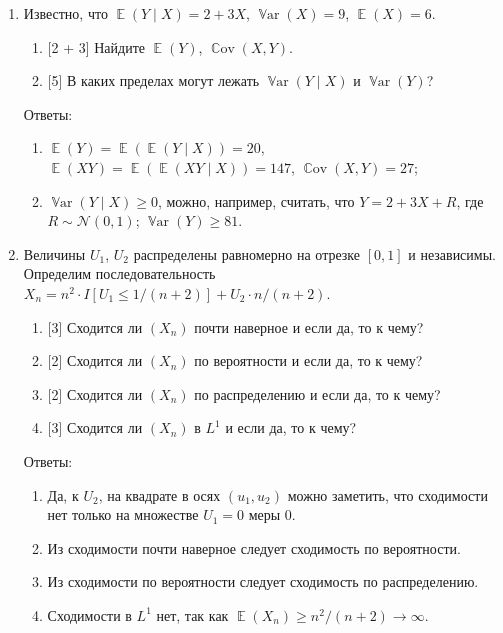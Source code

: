\documentclass[12pt]{article}
\DeclareMathOperator{\Cov}{\mathbb{C}ov}
\DeclareMathOperator{\Var}{\mathbb{V}ar}
\DeclareMathOperator{\E}{\mathbb{E}}
\newcommand \cN{\mathcal{N}}
\begin{document}
\begin{enumerate}

    \item Известно, что $\E(Y \mid X) = 2 + 3X$, $\Var(X) = 9$, $\E(X) = 6$.
    \begin{enumerate}
        \item {[2 + 3]} Найдите $\E(Y)$, $\Cov(X, Y)$.
        \item {[5]} В каких пределах могут лежать $\Var(Y \mid X)$ и $\Var(Y)$?
    \end{enumerate}

    Ответы:

    \begin{enumerate}
        \item $\E(Y) = \E(\E(Y \mid X)) = 20$, $\E(XY) = \E(\E(XY \mid X)) = 147$, $\Cov(X, Y) = 27$;
        \item $\Var(Y \mid X) \geq 0$, можно, например, считать, что $Y = 2 + 3X + R$, где $R \sim \cN(0, 1)$; $\Var(Y) \geq 81$.
    \end{enumerate}



    \item Величины $U_1$, $U_2$ распределены равномерно на отрезке $[0, 1]$ и независимы.
    Определим последовательность $X_n = n^2 \cdot I[U_1 \leq 1/(n + 2)] + U_2 \cdot n/ (n+2)$.

    \begin{enumerate}
        \item {[3]} Сходится ли $(X_n)$ почти наверное и если да, то к чему?
        \item {[2]} Сходится ли $(X_n)$ по вероятности и если да, то к чему?
        \item {[2]} Сходится ли $(X_n)$ по распределению и если да, то к чему?
        \item {[3]} Сходится ли $(X_n)$ в $L^1$ и если да, то к чему?
    \end{enumerate}

    Ответы: 

    \begin{enumerate}
        \item Да, к $U_2$, на квадрате в осях $(u_1, u_2)$ можно заметить, что сходимости нет только на множестве $U_1 = 0$ меры 0. 
        \item Из сходимости почти наверное следует сходимость по вероятности.
        \item Из сходимости по вероятности следует сходимость по распределению.
        \item Сходимости в $L^1$ нет, так как $\E(X_n) \geq n^2/(n+2) \to \infty$.
    \end{enumerate}



\end{enumerate}
\end{document}
